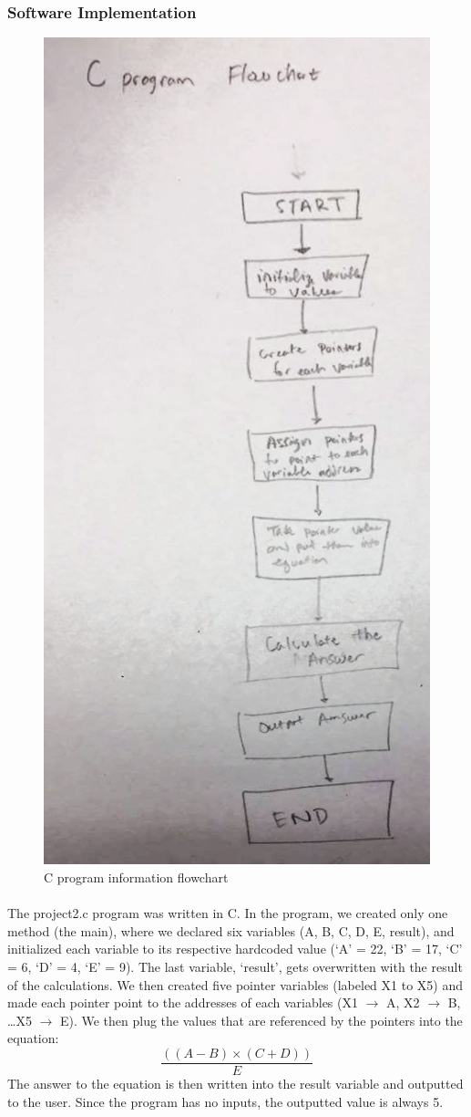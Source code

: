 \documentclass{article}
\begin{document}
		\subsubsection{Software Implementation}
      \begin{figure}[H]
        \centering
        \includegraphics[width=0.6\linewidth]{figures/c/C_flowchart.jpeg}
        \caption{C program information flowchart}
        \label{fig:C_program_flowchart}
      \end{figure}
    
      \paragraph{} The project2.c program was written in C. In the program, we created only one method (the main), where we declared six variables (A, B, C, D, E, result), and initialized each variable to its respective hardcoded value (‘A’ = 22, ‘B’ = 17, ‘C’ = 6, ‘D’ = 4, ‘E’ = 9). The last variable, ‘result’, gets overwritten with the result of the calculations. We then created five pointer variables (labeled X1 to X5) and made each pointer point to the addresses of each variables (X1 $\rightarrow$ A, X2 $\rightarrow$ B, \ldots X5 $\rightarrow$ E).  We then plug the values that are referenced by the pointers into the equation: \[\frac{((A - B) \times (C + D))}{E}\]
      The answer to the equation is then written into the result variable and outputted to the user. Since the program has no inputs, the outputted value is always 5.  
\end{document}
